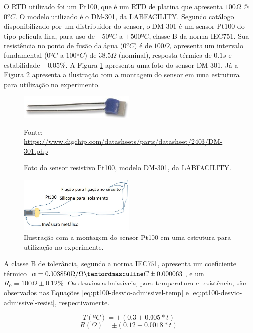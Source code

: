 \documentclass[a4paper]{instrumentacao}
\begin{document}
O RTD utilizado foi um Pt100, que é um RTD de platina que apresenta $100\Omega$ @ $0ºC$. O modelo utilizado é o DM-301, da LABFACILITY. Segundo catálogo \cite{catalogo-pt100} disponibilizado por um distribuidor do sensor, o DM-301 é um sensor Pt100 do tipo película fina, para uso de $-50ºC$ a $+500ºC$, classe B da norma IEC751. Sua resistência no ponto de fusão da água ($0ºC$) é de $100\Omega$, apresenta um intervalo fundamental ($0ºC$ a $100ºC$) de $38.5\Omega$ (nominal), resposta térmica de $0.1s$ e estabilidade $\pm 0.05\%$. A Figura \ref{fig:DM-301} apresenta uma foto do sensor DM-301. Já a Figura \ref{fig:termometro-ilustracao} apresenta a ilustração com a montagem do sensor em uma estrutura para utilização no experimento.

\begin{figure}[H]
	\centering \includegraphics[width=0.5\textwidth]{DM-301.jpg}
	\caption{Foto do sensor resistivo Pt100, modelo DM-301, da LABFACILITY.}
	Fonte: \url{https://www.digchip.com/datasheets/parts/datasheet/2403/DM-301.php}
	\label{fig:DM-301}
\end{figure}

\begin{figure}[H]
	\centering \includegraphics[width=0.5\textwidth]{termometro-ilustracao2.jpg}
	\caption{Ilustração com a montagem do sensor Pt100 em uma estrutura para utilização no experimento.}

	\label{fig:termometro-ilustracao}
\end{figure}

A classe B de tolerância, segundo a norma IEC751, apresenta um coeficiente térmico $\alpha = 0.003850 \Omega/\OmegaºC \pm 0.000063$, e um $R_0= 100\Omega \pm 0.12\%$. Os desvios admissíveis, para temperatura e resistência, são observados nas Equações \ref{eq:pt100-desvio-admissivel-temp} e \ref{eq:pt100-desvio-admissivel-resist}, respectivamente.

\begin{equation}
	T(ºC)=\pm (0.3+0.005*t)
	\label{eq:pt100-desvio-admissivel-temp}
\end{equation}
\begin{equation}
	R(\Omega)=\pm (0.12+0.0018*t)
	\label{eq:pt100-desvio-admissivel-resist}
\end{equation}
\end{document}
